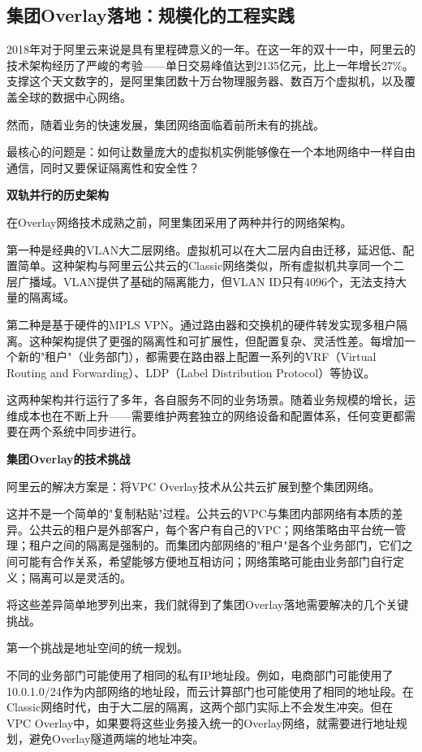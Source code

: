 \subsection{集团Overlay落地：规模化的工程实践}

2018年对于阿里云来说是具有里程碑意义的一年。在这一年的双十一中，阿里云的技术架构经历了严峻的考验——单日交易峰值达到2135亿元，比上一年增长27\%。支撑这个天文数字的，是阿里集团数十万台物理服务器、数百万个虚拟机，以及覆盖全球的数据中心网络。

然而，随着业务的快速发展，集团网络面临着前所未有的挑战。

最核心的问题是：如何让数量庞大的虚拟机实例能够像在一个本地网络中一样自由通信，同时又要保证隔离性和安全性？

\textbf{双轨并行的历史架构}

在Overlay网络技术成熟之前，阿里集团采用了两种并行的网络架构。

第一种是经典的VLAN大二层网络。虚拟机可以在大二层内自由迁移，延迟低、配置简单。这种架构与阿里云公共云的Classic网络类似，所有虚拟机共享同一个二层广播域。VLAN提供了基础的隔离能力，但VLAN ID只有4096个，无法支持大量的隔离域。

第二种是基于硬件的MPLS VPN。通过路由器和交换机的硬件转发实现多租户隔离。这种架构提供了更强的隔离性和可扩展性，但配置复杂、灵活性差。每增加一个新的"租户"（业务部门），都需要在路由器上配置一系列的VRF（Virtual Routing and Forwarding）、LDP（Label Distribution Protocol）等协议。

这两种架构并行运行了多年，各自服务不同的业务场景。随着业务规模的增长，运维成本也在不断上升——需要维护两套独立的网络设备和配置体系，任何变更都需要在两个系统中同步进行。

\textbf{集团Overlay的技术挑战}

阿里云的解决方案是：将VPC Overlay技术从公共云扩展到整个集团网络。

这并不是一个简单的"复制粘贴"过程。公共云的VPC与集团内部网络有本质的差异。公共云的租户是外部客户，每个客户有自己的VPC；网络策略由平台统一管理；租户之间的隔离是强制的。而集团内部网络的"租户"是各个业务部门，它们之间可能有合作关系，希望能够方便地互相访问；网络策略可能由业务部门自行定义；隔离可以是灵活的。

将这些差异简单地罗列出来，我们就得到了集团Overlay落地需要解决的几个关键挑战。

第一个挑战是地址空间的统一规划。

不同的业务部门可能使用了相同的私有IP地址段。例如，电商部门可能使用了10.0.1.0/24作为内部网络的地址段，而云计算部门也可能使用了相同的地址段。在Classic网络时代，由于大二层的隔离，这两个部门实际上不会发生冲突。但在VPC Overlay中，如果要将这些业务接入统一的Overlay网络，就需要进行地址规划，避免Overlay隧道两端的地址冲突。

